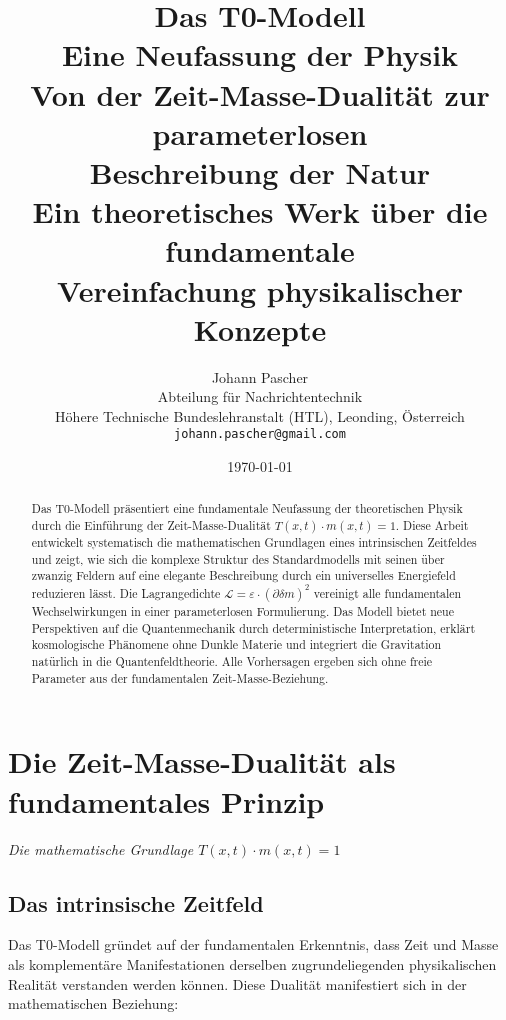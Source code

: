 \documentclass[12pt,a4paper]{report}
\title{
	{\Huge Das T0-Modell}\\
	{\LARGE Eine Neufassung der Physik}\\
	{\Large Von der Zeit-Masse-Dualität zur parameterlosen\\Beschreibung der Natur}\\
	\vspace{1cm}
	{\large Ein theoretisches Werk über die fundamentale\\Vereinfachung physikalischer Konzepte}
}
\author{
	{\Large Johann Pascher}\\
	Abteilung für Nachrichtentechnik\\
	Höhere Technische Bundeslehranstalt (HTL), Leonding, Österreich\\
	\texttt{johann.pascher@gmail.com}
}
\begin{document}
	\maketitle

	\date{\today}
	
	\maketitle
	
	\begin{abstract}
		Das T0-Modell präsentiert eine fundamentale Neufassung der theoretischen Physik durch die Einführung der Zeit-Masse-Dualität $T(x,t) \cdot m(x,t) = 1$. Diese Arbeit entwickelt systematisch die mathematischen Grundlagen eines intrinsischen Zeitfeldes und zeigt, wie sich die komplexe Struktur des Standardmodells mit seinen über zwanzig Feldern auf eine elegante Beschreibung durch ein universelles Energiefeld reduzieren lässt. Die Lagrangedichte $\mathcal{L} = \varepsilon \cdot (\partial\delta m)^2$ vereinigt alle fundamentalen Wechselwirkungen in einer parameterlosen Formulierung. Das Modell bietet neue Perspektiven auf die Quantenmechanik durch deterministische Interpretation, erklärt kosmologische Phänomene ohne Dunkle Materie und integriert die Gravitation natürlich in die Quantenfeldtheorie. Alle Vorhersagen ergeben sich ohne freie Parameter aus der fundamentalen Zeit-Masse-Beziehung.
	\end{abstract}
	
	\tableofcontents
	\newpage
	
	\chapter{Die Zeit-Masse-Dualität als fundamentales Prinzip}
	\textit{Die mathematische Grundlage $T(x,t) \cdot m(x,t) = 1$}
	
	\section{Das intrinsische Zeitfeld}
	
	Das T0-Modell gründet auf der fundamentalen Erkenntnis, dass Zeit und Masse als komplementäre Manifestationen derselben zugrundeliegenden physikalischen Realität verstanden werden können. Diese Dualität manifestiert sich in der mathematischen Beziehung:
	
\end{document}
